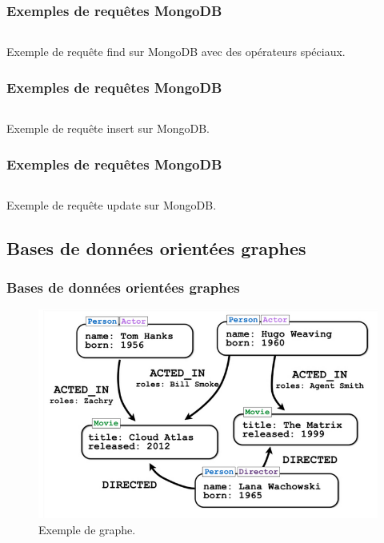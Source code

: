 	\begin{frame}
		\frametitle{Exemples de requêtes MongoDB}
		
		\begin{listing}[H]
			\inputminted{javascript}{code/requeteMongoFindOperator.js}
			\caption{Exemple de requête find sur MongoDB avec des opérateurs spéciaux.}
			\label{findOperatorMongoDB}
		\end{listing}
	\end{frame}
		
	\begin{frame}
		\frametitle{Exemples de requêtes MongoDB}

		\begin{listing}[H]
			\inputminted{javascript}{code/requeteMongoInsert.js}
			\caption{Exemple de requête insert sur MongoDB.}
			\label{insertMongoDB}
		\end{listing}
	\end{frame}

		
	\begin{frame}
		\frametitle{Exemples de requêtes MongoDB}
		
		\begin{listing}[H]
			\inputminted{javascript}{code/requeteMongoUpdate.js}
			\caption{Exemple de requête update sur MongoDB.}
			\label{updateMongoDB}
		\end{listing}
	\end{frame}
	
	\subsection{Bases de données orientées graphes}
	\begin{frame}
		\frametitle{Bases de données orientées graphes}

		\begin{figure}[htb]
			\includegraphics[width=1\textwidth]{images/graphe.png}
			\caption{Exemple de graphe.}
		\end{figure}
	\end{frame}

